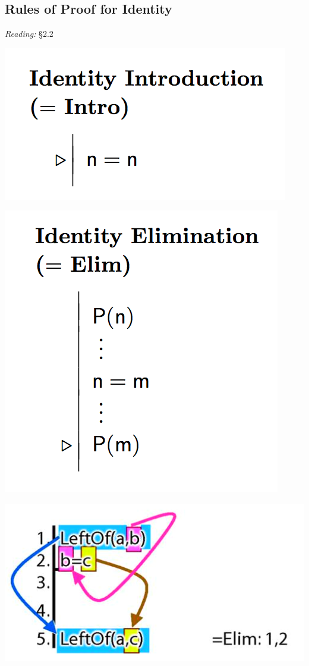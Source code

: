 \documentclass[12pt]{extarticle}
\begin{document}
\begin{multicols*}{3}
 
\section{Rules of Proof for Identity}
 
\emph{Reading:} §2.2
 
\begin{center}
\includegraphics[scale=0.3]{img/rule_identity_intro.png}
\end{center}
\begin{center}
\includegraphics[scale=0.3]{img/rule_identity_elim.png}
\end{center}
\begin{center}
\includegraphics[scale=0.3]{img/proof_identity_example.png}
\end{center}
 

\end{multicols*}
\end{document}
